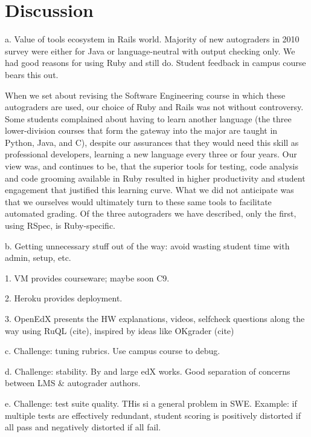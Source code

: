 \section{Discussion}



a.	Value of tools ecosystem in Rails world. Majority of new autograders in 2010 survey were either for Java or language-neutral with output checking only. We had good reasons for using Ruby and still do. Student feedback in campus course bears this out.


When we set about revising the Software Engineering course in which
these autograders are used, our choice of Ruby and Rails was not without
controversy.  Some students complained about having to learn another
language (the three lower-division courses that form the gateway into
the major are taught in Python, Java, and C), despite our assurances
that they would need this skill  as professional developers, learning a
new language every three or four years.  Our view was, and continues to
be, that the superior tools for testing, code analysis and code grooming
available in Ruby resulted in higher productivity and student engagement
that justified this learning curve.  What we did not anticipate was that
we ourselves would ultimately turn to these same tools to facilitate
automated grading.  Of the three autograders we have described, only the
first, using RSpec, is Ruby-specific.



b.	Getting unnecessary stuff out of the way: avoid wasting student time with admin, setup, etc.  

1.	VM provides courseware; maybe soon C9.  

2.	Heroku provides deployment.  

3.	OpenEdX presents the HW explanations, videos, selfcheck questions along the way using RuQL (cite), inspired by ideas like OKgrader (cite)

c.	Challenge: tuning rubrics. Use campus course to debug.

d.	Challenge: stability. By and large edX works.  Good separation of concerns between LMS & autograder authors.

e.	Challenge: test suite quality. THis si a general problem in SWE. Example: if multiple tests are effectively redundant, student scoring is positively distorted if all pass and negatively distorted if all fail.



